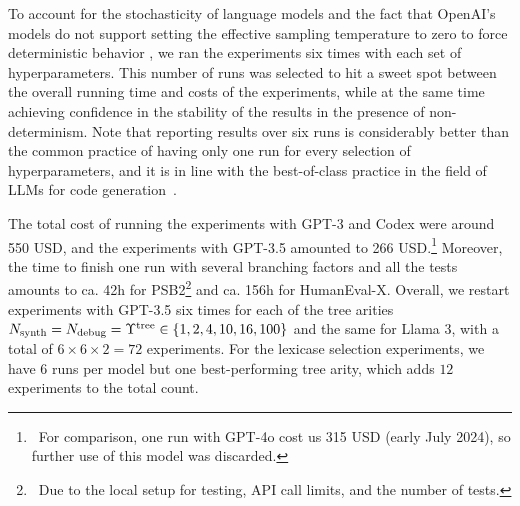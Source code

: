 To account for the stochasticity of language models and the fact that OpenAI's models do not support setting the effective sampling temperature to zero to force deterministic behavior \cite{ObservingDiscrepancyCompletions2023}, we ran the experiments six times with each set of hyperparameters.
This number of runs was selected to hit a sweet spot between the overall running time and costs of the experiments, while at the same time achieving confidence in the stability of the results in the presence of non-determinism. 
Note that reporting results over six runs is considerably better than the common practice of having only one run for every selection of hyperparameters, and it is in line with the best-of-class practice in the field of LLMs for code generation~\cite{ouyangLLMBoxChocolates2023}.

The total cost of running the experiments with GPT-3 and Codex were around 550 USD, and the experiments with GPT-3.5 amounted to 266 USD.\footnote{~For comparison, one run with GPT-4o cost us 315 USD (early July 2024), so further use of this model was discarded.}
Moreover, the time to finish one run with several branching factors and all the tests amounts to ca. 42h for PSB2\footnote{~Due to the local setup for testing, API call limits, and the number of tests.} and ca. 156h for HumanEval-X.
Overall, we restart experiments with GPT-3.5 six times for each of the tree arities $ N_{\text{synth}} = N_{\text{debug}} = \Upsilon^\text{tree} \in \{1,2, 4,10,16,100\}$ and the same for Llama 3, with a total of $6 \times 6 \times 2 = 72$ experiments. 
For the lexicase selection experiments, we have 6 runs per model but one best-performing tree arity, which adds $12$ experiments to the total count.

